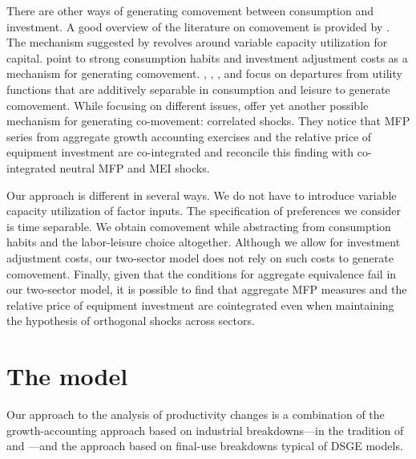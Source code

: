\documentclass[12pt,fleqn]{article}
\begin{document}
There are other ways of generating comovement between
consumption and investment. A good overview of the literature on
comovement is provided by . The mechanism suggested by
 revolves around variable capacity
utilization for capital.  point to strong
consumption habits and investment adjustment costs as a mechanism
for generating comovement. ,
, ,  and
 focus on departures from utility
functions that are additively separable in consumption and leisure
to generate comovement. While focusing on different issues,
 offer yet another possible mechanism for
generating co-movement: correlated shocks. They notice that MFP
series from aggregate growth accounting exercises and the relative
price of equipment investment are co-integrated and reconcile this
finding with co-integrated neutral MFP and MEI shocks.

Our approach is different in several ways. We do not
have to introduce variable capacity utilization of factor inputs. The specification of preferences we consider is time separable.
We obtain comovement while abstracting from consumption habits and the labor-leisure choice
altogether. Although we allow for investment
adjustment costs, our two-sector model does not rely on such costs
to generate comovement. Finally, given that the conditions for
aggregate equivalence fail in our two-sector model, it is possible to find
that aggregate MFP measures and the relative price of equipment
investment are cointegrated even when maintaining the hypothesis
of orthogonal shocks across sectors.

\section{\protect\normalsize The model}

Our approach to the analysis of productivity changes is a
combination of the growth-accounting approach based on industrial
breakdowns---in the tradition of  and %
---and the approach based on final-use breakdowns typical of DSGE models.
\end{document}
